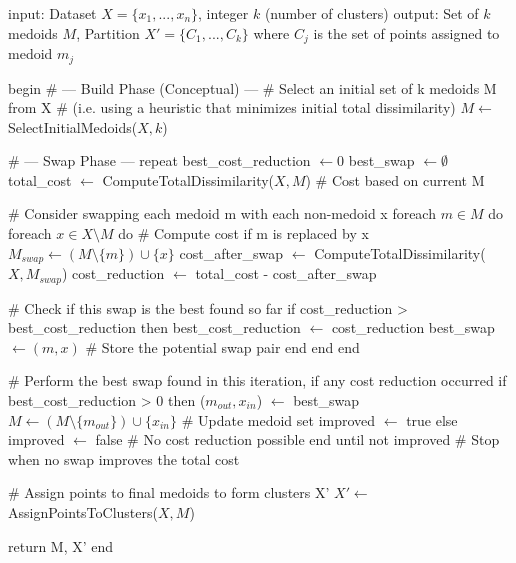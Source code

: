 \documentclass[10pt,oneside]{report}
\begin{document}
\begin{algorithm}[caption={Partitioning Around Medoids (PAM).}, label={alg:pam}]
input: Dataset $X = \{x_1, ..., x_n\}$, integer $k$ (number of clusters)
output: Set of $k$ medoids $M$, Partition $X' = \{C_1, ..., C_k\}$ where $C_j$ is the set of points assigned to medoid $m_j$

begin
    # --- Build Phase (Conceptual) ---
    # Select an initial set of k medoids M from X
    # (i.e. using a heuristic that minimizes initial total dissimilarity)
    $M \gets$ SelectInitialMedoids($X, k$)

    # --- Swap Phase ---
    repeat
        best_cost_reduction $\gets 0$
        best_swap $\gets \emptyset$ 
        total_cost $\gets$ ComputeTotalDissimilarity($X, M$) # Cost based on current M

        # Consider swapping each medoid m with each non-medoid x
        foreach $m \in M$ do
            foreach $x \in X \setminus M$ do
                # Compute cost if m is replaced by x
                $M_{swap} \gets (M \setminus \{m\}) \cup \{x\}$
                cost_after_swap $\gets$ ComputeTotalDissimilarity($X, M_{swap}$)
                cost_reduction $\gets$ total_cost - cost_after_swap

                # Check if this swap is the best found so far
                if cost_reduction > best_cost_reduction then
                    best_cost_reduction $\gets$ cost_reduction
                    best_swap $\gets (m, x)$ # Store the potential swap pair
                end
            end
        end

        # Perform the best swap found in this iteration, if any cost reduction occurred
        if best_cost_reduction > 0 then
            ($m_{out}, x_{in}$) $\gets$ best_swap
            $M \gets (M \setminus \{m_{out}\}) \cup \{x_{in}\}$ # Update medoid set
            improved $\gets$ true
        else
            improved $\gets$ false # No cost reduction possible
        end
    until not improved # Stop when no swap improves the total cost

    # Assign points to final medoids to form clusters X'
    $X' \gets$ AssignPointsToClusters($X, M$)

    return M, X'
end
\end{algorithm}

\end{document}

